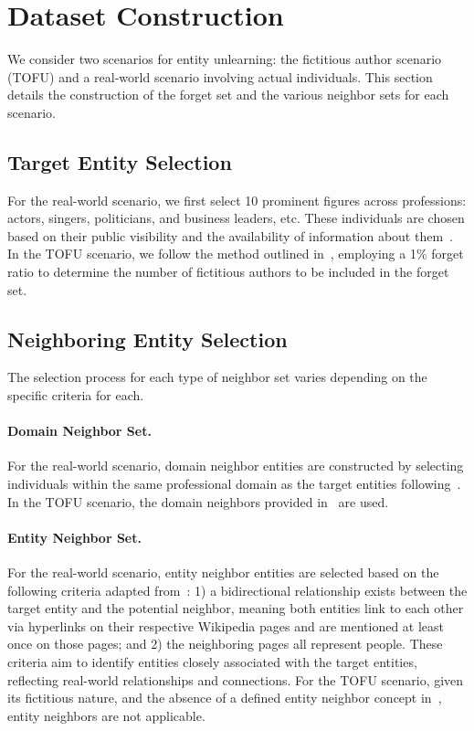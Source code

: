 
\section{Dataset Construction}
We consider two scenarios for entity unlearning: the fictitious author scenario (TOFU) and a real-world scenario involving actual individuals.  This section details the construction of the forget set and the various neighbor sets for each scenario.

\subsection{Target Entity Selection}

For the real-world scenario, we first select 10 prominent figures across professions: actors, singers, politicians, and business leaders, etc.  These individuals are chosen based on their public visibility and the availability of information about them~\citep{rwku, choi2024opt}. In the TOFU scenario, we follow the method outlined in~\citet{maini2024tofu}, employing a 1\% forget ratio to determine the number of fictitious authors to be included in the forget set.

\subsection{Neighboring Entity Selection}
\label{sec:neighborentityselection}
The selection process for each type of neighbor set varies depending on the specific criteria for each.

\paragraph{Domain Neighbor Set.} For the real-world scenario, domain neighbor entities are constructed by selecting individuals within the same professional domain as the target entities following~\citet{closerlookat, liu2024revisitingharrypotter}. In the TOFU scenario, the domain neighbors provided in~\citet{maini2024tofu} are used.
\paragraph{Entity Neighbor Set.}  For the real-world scenario, entity neighbor entities are selected based on the following criteria adapted from~\citet{choi2024opt, rwku}: 1) a bidirectional relationship exists between the target entity and the potential neighbor, meaning both entities link to each other via hyperlinks on their respective Wikipedia pages and are mentioned at least once on those pages; and 2) the neighboring pages all represent people.  These criteria aim to identify entities closely associated with the target entities, reflecting real-world relationships and connections. For the TOFU scenario, given its fictitious nature, and the absence of a defined entity neighbor concept in~\citet{maini2024tofu}, entity neighbors are not applicable.


